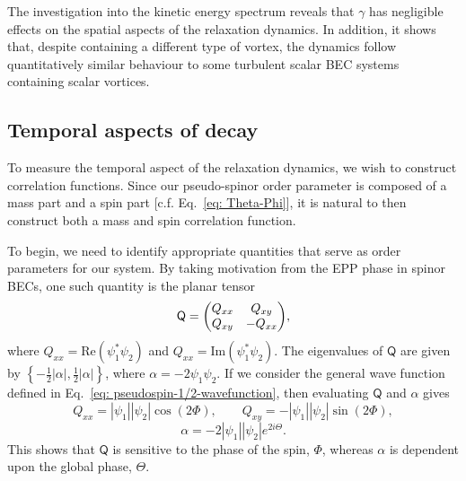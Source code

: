 The investigation into the kinetic energy spectrum reveals that \(\gamma \) has
negligible effects on the spatial aspects of the relaxation dynamics.
In addition, it shows that, despite containing a different type of vortex, the
dynamics follow quantitatively similar behaviour to some turbulent scalar BEC
systems containing scalar vortices.

\subsection{Temporal aspects of decay}
To measure the temporal aspect of the relaxation dynamics, we wish to
construct correlation functions.
Since our pseudo-spinor order parameter is composed of a mass part and a spin
part [c.f. Eq.~\eqref{eq: Theta-Phi}], it is natural to then construct both a
mass and spin correlation function.

To begin, we need to identify appropriate quantities that serve as order
parameters for our system.
By taking motivation from the EPP phase in spinor BECs, one such quantity is
the planar tensor~\cite{Symes2017}
\begin{equation}
    \mathsf{Q} = \mqty(Q_{xx} & Q_{xy} \\ Q_{xy} & -Q_{xx}),
\end{equation}
where \(Q_{xx} = \mathrm{Re}(\psi_1^*\psi_2)\) and
\(Q_{xx} = \mathrm{Im}(\psi_1^*\psi_2)\).
The eigenvalues of \(\mathsf{Q}\) are given by
\( \left\{-\frac{1}{2}|\alpha|, \frac{1}{2}|\alpha|\right\} \), where
\(\alpha=-2\psi_1\psi_2\).
If we consider the general wave function defined in
Eq.~\eqref{eq: pseudospin-1/2-wavefunction}, then evaluating \(\mathsf{Q}\) and
\(\alpha \) gives
\begin{equation}
    Q_{xx} = |\psi_1||\psi_2|\cos({2\Phi}), \qquad 
    Q_{xy} = -|\psi_1||\psi_2|\sin({2\Phi}),
\end{equation}
\begin{equation}
    \alpha = -2|\psi_1||\psi_2|e^{2i\Theta}.
\end{equation}
This shows that \(\mathsf{Q}\) is sensitive to the phase of the spin,
\( \Phi \), whereas \(\alpha \) is dependent upon the global phase,
\( \Theta \).

